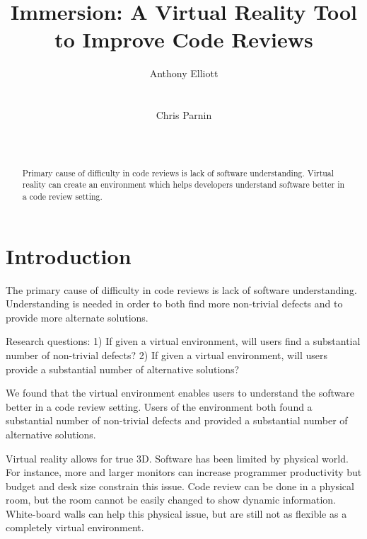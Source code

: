 \documentclass{acm_proc_article-sp}
\begin{document}
\title{Immersion: A Virtual Reality Tool to Improve Code Reviews}

\author{
\alignauthor
Anthony Elliott\\
       \\
       \\
\alignauthor
Chris Parnin\\
       \\
       \\
}

\maketitle
\begin{abstract}
Primary cause of difficulty in code reviews is lack of software understanding. Virtual reality can create an environment which helps developers understand software better in a code review setting.
\end{abstract}

\section{Introduction}
The primary cause of difficulty in code reviews is lack of software understanding. Understanding is needed in order to both find more non-trivial defects and to provide more alternate solutions.

Research questions:
1) If given a virtual environment, will users find a substantial number of non-trivial defects?
2) If given a virtual environment, will users provide a substantial number of alternative solutions?

We found that the virtual environment enables users to understand the software better in a code review setting. Users of the environment both found a substantial number of non-trivial defects and provided a substantial number of alternative solutions.

Virtual reality allows for true 3D.
Software has been limited by physical world. For instance, more and larger monitors can increase programmer productivity but budget and desk size constrain this issue.
Code review can be done in a physical room, but the room cannot be easily changed to show dynamic information. White-board walls can help this physical issue, but are still not as flexible as a completely virtual environment.
\end{document}
